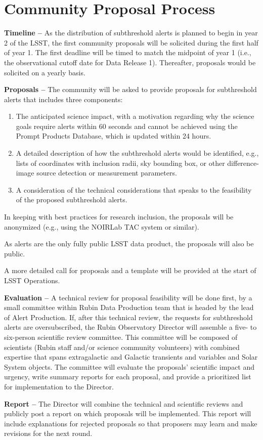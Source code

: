 \section{Community Proposal Process}\label{sec:process}

\textbf{Timeline --}
As the distribution of subthreshold alerts is planned to begin in year 2 of the LSST, the first community proposals will be solicited during the first half of year 1.
The first deadline will be timed to match the midpoint of year 1 (i.e., the observational cutoff date for Data Release 1).
Thereafter, proposals would be solicited on a yearly basis.

\textbf{Proposals --}
The community will be asked to provide proposals for subthreshold alerts that includes three components:

\begin{enumerate}
\item The anticipated science impact, with a motivation regarding why the science goals require alerts within 60 seconds and cannot be achieved using the Prompt Products Database, which is updated within 24 hours.
\item A detailed description of how the subthreshold alerts would be identified, e.g., lists of coordinates with inclusion radii, sky bounding box, or other difference-image source detection or measurement parameters.
\item A consideration of the technical considerations that speaks to the feasibility of the proposed subthreshold alerts.
\end{enumerate}

In keeping with best practices for research inclusion, the proposals will be anonymized (e.g., using the NOIRLab TAC system or similar).

As alerts are the only fully public LSST data product, the proposals will also be public.

A more detailed call for proposals and a template will be provided at the start of LSST Operations.

\textbf{Evaluation --} A technical review for proposal feasibility will be done first, by a small committee within Rubin Data Production team that is headed by the lead of Alert Production.
If, after this technical review, the requests for subthreshold alerts are oversubscribed, the Rubin Observatory Director will assemble a five- to six-person scientific review committee.
This committee will be composed of scientists (Rubin staff and/or science community volunteers) with combined expertise that spans extragalactic and Galactic transients and variables and Solar System objects.
The committee will evaluate the proposals' scientific impact and urgency, write summary reports for each proposal, and provide a prioritized list for implementation to the Director.

\textbf{Report --} The Director will combine the technical and scientific reviews and publicly post a report on which proposals will be implemented.
This report will include explanations for rejected proposals so that proposers may learn and make revisions for the next round.
